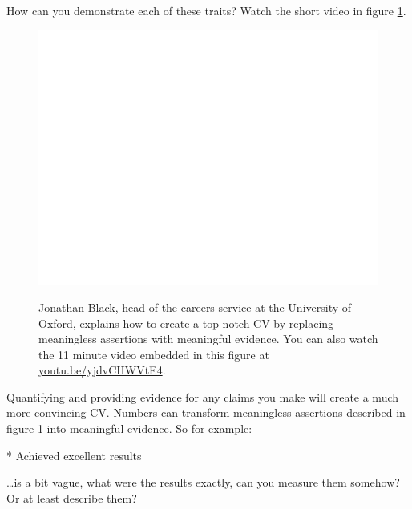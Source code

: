 \documentclass[
]{book}
\newenvironment{Shaded}{\begin{snugshade}}{\end{snugshade}}
\newcommand{\NormalTok}[1]{#1}
\newcommand{\SpecialStringTok}[1]{\textcolor[rgb]{0.31,0.60,0.02}{#1}}
\begin{document}
How can you demonstrate each of these traits? Watch the short video in figure \ref{fig:black-fig}.

\begin{figure}

{\centering \href{https://www.youtube.com/embed/yjdvCHWVtE4}{\includegraphics[width=0.99\linewidth]{cdyf_files/figure-latex/black-fig-1} }

}

\caption{\href{https://twitter.com/jonathanpblack}{Jonathan Black}, head of the careers service at the University of Oxford, explains how to create a top notch CV by replacing meaningless assertions with meaningful evidence. You can also watch the 11 minute video embedded in this figure at \href{https://youtu.be/yjdvCHWVtE4}{youtu.be/yjdvCHWVtE4}. \citep{topnotchcv}}\label{fig:black-fig}
\end{figure}



Quantifying and providing evidence for any claims you make will create a much more convincing CV. Numbers can transform meaningless assertions described in figure \ref{fig:black-fig} into meaningful evidence. So for example:

\begin{Shaded}
\begin{Highlighting}[]
\SpecialStringTok{* }\NormalTok{Achieved excellent results}
\end{Highlighting}
\end{Shaded}

\ldots is a bit vague, what were the results exactly, can you measure them somehow? Or at least describe them?
\end{document}
